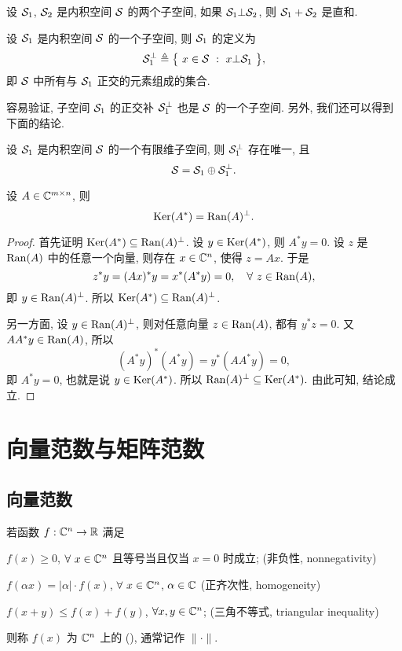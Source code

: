 \begin{theorem}
	设 $\mathcal{S}_1$, $\mathcal{S}_2$ 是内积空间 $\mathcal{S}$ 的两个子空间,
	如果 $\mathcal{S}_1\bot\mathcal{S}_2$, 则 $\mathcal{S}_1+\mathcal{S}_2$ 是直和.
\end{theorem}

\begin{definition}[正交补]
	设 $\mathcal{S}_1$ 是内积空间 $\mathcal{S}$ 的一个子空间, 则 $\mathcal{S}_1$ 的定义为
	$$
	\mathcal{S}_1^{\bot} \triangleq \big\{\ x\in\mathcal{S}\ :\ x\bot \mathcal{S}_1\ \big\},
	$$
	即 $\mathcal{S}$ 中所有与 $\mathcal{S}_1$ 正交的元素组成的集合.
\end{definition}

容易验证, 子空间 $\mathcal{S}_1$ 的正交补 $\mathcal{S}_1^{\bot}$ 也是 $\mathcal{S}$ 的一个子空间.
另外, 我们还可以得到下面的结论.
\begin{theorem}
	设 $\mathcal{S}_1$ 是内积空间 $\mathcal{S}$ 的一个有限维子空间,
	则 $\mathcal{S}_1^{\bot}$ 存在唯一, 且
	$$ \mathcal{S} = \mathcal{S}_1\oplus\mathcal{S}_1^{\bot}.$$
\end{theorem}

\begin{example}
	设 $A\in\mathbb{C}^{m\times n}$, 则
	$$ \mathrm{Ker}(A^*) = \mathrm{Ran}(A)^\bot.$$
	\begin{proof}
		首先证明 $\mathrm{Ker}(A^*) \subseteq \mathrm{Ran}(A)^\bot$.
		设 $y\in\mathrm{Ker}(A^*)$, 则 $A^*y=0$.
		设 $z$ 是 $\mathrm{Ran}(A)$ 中的任意一个向量, 则存在 $x\in\mathbb{C}^n$, 使得 $z=Ax$.
		于是
		$$ z^*y = (Ax)^* y = x^*(A^*y) = 0, \quad \forall\ z\in\mathrm{Ran}(A), $$
		即 $y\in\mathrm{Ran}(A)^\bot$. 所以 $\mathrm{Ker}(A^*) \subseteq \mathrm{Ran}(A)^\bot$.
		
		另一方面, 设 $y\in\mathrm{Ran}(A)^\bot$, 则对任意向量 $z\in\mathrm{Ran}(A)$,
		都有 $y^*z=0$. 又 $AA^*y\in\mathrm{Ran}(A)$, 所以
		$$ (A^*y)^* (A^*y) = y^*(AA^*y)=0,$$
		即 $A^*y=0$, 也就是说 $y\in\mathrm{Ker}(A^*)$.
		所以 $\mathrm{Ran}(A)^\bot\subseteq\mathrm{Ker}(A^*).$
		由此可知, 结论成立.
	\end{proof}
\end{example}


\section{向量范数与矩阵范数}
\subsection{向量范数}
\begin{definition}[向量范数]
	若函数 $f:\mathbb{C}^n\to\mathbb{R}$ 满足
	\begin{nlist}
		\item $f(x)\geq 0$, $\forall\ x\in\mathbb{C}^n$ 且等号当且仅当 $x=0$ 时成立;
		(非负性, nonnegativity)
		\item $f(\alpha x)=|\alpha|\cdot f(x)$, $\forall\ x\in\mathbb{C}^n$, $\alpha\in\mathbb{C}$
		(正齐次性, homogeneity)
		\item $f(x+y)\leq f(x)+f(y)$, $\forall x,y\in\mathbb{C}^n$;
		(三角不等式, triangular inequality)
	\end{nlist}
	则称 $f(x)$ 为 $\mathbb{C}^n$ 上的  (),
	通常记作 $\|\cdot\|$.
\end{definition}

